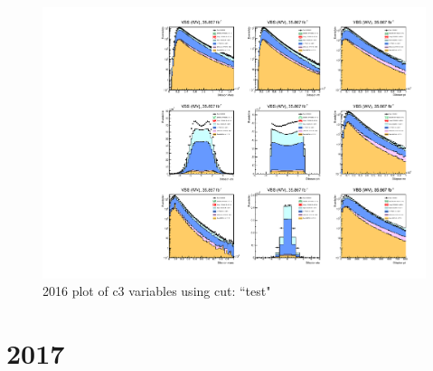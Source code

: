 \documentclass{article}
\begin{document}
            \begin{figure}[H]
                \centering
                \includegraphics[width=\textwidth]{2016/c3_2016_test.pdf}
                \caption{2016 plot of c3 variables using cut: ``test"}
            \end{figure}
    \section*{2017}
\end{document}
